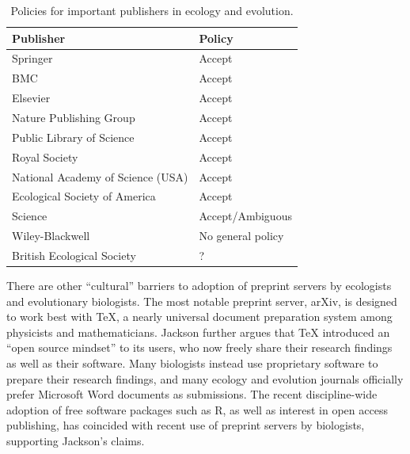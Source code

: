\documentclass[letterpaper,twocolumn,superscriptaddress,showkeys]{revtex4}
\begin{document}
\begin{table}
    \centering
    \begin{tabular}{|ll|}
    \hline
    Publisher                                   & Policy \\
    \hline
    Springer                            	& Accept \\
    BMC                                 	& Accept \\
    Elsevier                            	& Accept \\
    Nature Publishing Group             	& Accept \\
    Public Library of Science           	& Accept \\
    Royal Society                       	& Accept \\
    National Academy of Science (USA)           & Accept \\
    Ecological Society of America       	& Accept \\ %
    Science                             	& Accept/Ambiguous \\
    Wiley-Blackwell                       	& No general policy \\ %
    British Ecological Society                  & ? \\ %
    \hline
    \end{tabular}
    \caption{Policies for important publishers in ecology and evolution.}
    \label{table:policies}
\end{table}

There are other ``cultural'' barriers to adoption of preprint servers
by ecologists and evolutionary biologists.  The most notable preprint
server, arXiv, is designed to work best with \TeX{}, a nearly
universal document preparation system among physicists and
mathematicians.  Jackson \cite{jackson2002preprints} further argues
that \TeX{} introduced an ``open source mindset'' to its users, who
now freely share their research findings as well as their software.
Many biologists instead use proprietary software to prepare their
research findings, and many ecology and evolution journals officially
prefer Microsoft Word documents as submissions.  The recent
discipline-wide adoption of free software packages such as R, as well
as interest in open access publishing, has coincided with recent use
of preprint servers by biologists, supporting Jackson's claims.
\end{document}
